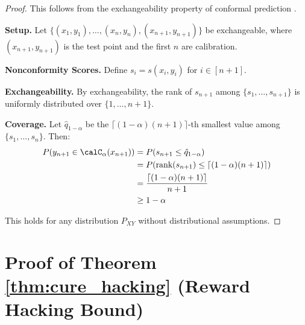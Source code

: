 \documentclass[11pt,a4paper]{article}
\begin{document}
\begin{proof}
This follows from the exchangeability property of conformal prediction \citep{vovk2005algorithmic}.

\textbf{Setup.} Let $\{(x_1, y_1), \ldots, (x_n, y_n), (x_{n+1}, y_{n+1})\}$ be exchangeable, where $(x_{n+1}, y_{n+1})$ is the test point and the first $n$ are calibration.

\textbf{Nonconformity Scores.} Define $s_i = s(x_i, y_i)$ for $i \in [n+1]$.

\textbf{Exchangeability.} By exchangeability, the rank of $s_{n+1}$ among $\{s_1, \ldots, s_{n+1}\}$ is uniformly distributed over $\{1, \ldots, n+1\}$.

\textbf{Coverage.} Let $\hat{q}_{1-\alpha}$ be the $\lceil(1-\alpha)(n+1)\rceil$-th smallest value among $\{s_1, \ldots, s_n\}$. Then:
\begin{align}
    P(y_{n+1} \in \calC_\alpha(x_{n+1})) &= P(s_{n+1} \leq \hat{q}_{1-\alpha}) \\
    &= P(\text{rank}(s_{n+1}) \leq \lceil(1-\alpha)(n+1)\rceil) \\
    &= \frac{\lceil(1-\alpha)(n+1)\rceil}{n+1} \\
    &\geq 1 - \alpha
\end{align}

This holds for any distribution $P_{XY}$ without distributional assumptions.
\end{proof}

\section{Proof of Theorem \ref{thm:cure_hacking} (Reward Hacking Bound)}
\end{document}
